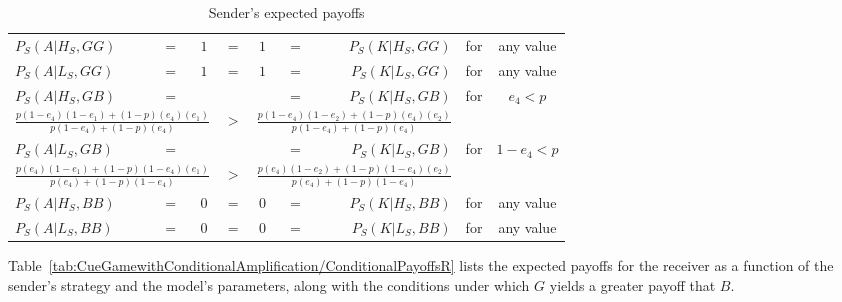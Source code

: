 \documentclass[a4paper,12pt]{article}
\numberwithin{equation}{section}
\begin{document}
\begin{table}[h]
\begin{center}
\begin{tabular}{lcccccrcc}
$P_{S}(A|H_{S},GG)$ & $=$ & $1$ & $=$ & $1$ & $=$ & $P_{S}(K|H_{S},GG)$ & for & any value\\
$P_{S}(A|L_{S},GG)$ & $=$ & $1$ & $=$ & $1$ & $=$ & $P_{S}(K|L_{S},GG)$ & for & any value\\
$P_{S}(A|H_{S},GB)$ & $=$ & \hspace{16mm} & & \hspace{16mm} & $=$ & $P_{S}(K|H_{S},GB)$ & \multirow{2}{*}{for} & \multirow{2}{*}{$e_{4}<p$}
\vspace{-1mm}\\
\multicolumn{3}{r}{$\frac{p(1-e_{4})(1-e_{1})+(1-p)(e_{4})(e_{1})}{p(1-e_{4})+(1-p)(e_{4})}$} & $>$ & \multicolumn{3}{l}{$\frac{p(1-e_{4})(1-e_{2})+(1-p)(e_{4})(e_{2})}{p(1-e_{4})+(1-p)(e_{4})}$} &
\vspace{1mm}\\
$P_{S}(A|L_{S},GB)$ & $=$ & & & & $=$ & $P_{S}(K|L_{S},GB)$ & \multirow{2}{*}{for} & \multirow{2}{*}{$1-e_{4}<p$}
\vspace{-1mm}\\
\multicolumn{3}{r}{$\frac{p(e_{4})(1-e_{1})+(1-p)(1-e_{4})(e_{1})}{p(e_{4})+(1-p)(1-e_{4})}$} & $>$ & \multicolumn{3}{l}{$\frac{p(e_{4})(1-e_{2})+(1-p)(1-e_{4})(e_{2})}{p(e_{4})+(1-p)(1-e_{4})}$} & 
\vspace{1mm}\\
$P_{S}(A|H_{S},BB)$ & $=$ & $0$ & $=$ & $0$ & $=$ & $P_{S}(K|H_{S},BB)$ & for & any value\\
$P_{S}(A|L_{S},BB)$ & $=$ & $0$ & $=$ & $0$ & $=$ & $P_{S}(K|L_{S},BB)$ & for & any value
\end{tabular}
\end{center}
\caption{Sender's expected payoffs}
\label{tab:CueGamewithConditionalAmplification/ConditionalPayoffsS}
\end{table}

Table~\ref{tab:CueGamewithConditionalAmplification/ConditionalPayoffsR} lists the expected payoffs for the receiver as a function of the sender's strategy and the model's parameters, along with the conditions under which $G$ yields a greater payoff that $B$.
\end{document}
